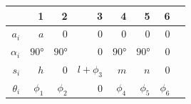\documentclass[onecolumn,10pt]{jhwhw}
\begin{document}
\begin{center}
\begin{tabular}{r|rrrrrrr}
           & 1          & 2          & 3            & 4          & 5           & 6          \\
\midrule
$a_i$      & $a$        & 0          & 0            & 0          & 0           & 0          \\
$\alpha_i$ & $\ang{90}$ & $\ang{90}$ & 0            & $\ang{90}$ & $\ang{90}$  & 0          \\
$s_i$      & $h$        & 0          & $l + \phi_3$ & $m$        & $n$         & 0          \\
$\theta_i$ & $\phi_1$   & $\phi_2$   & 0            & $\phi_4$   & $\phi_5$    & $\phi_6$   \\
\end{tabular}
\end{center}
\end{document}
